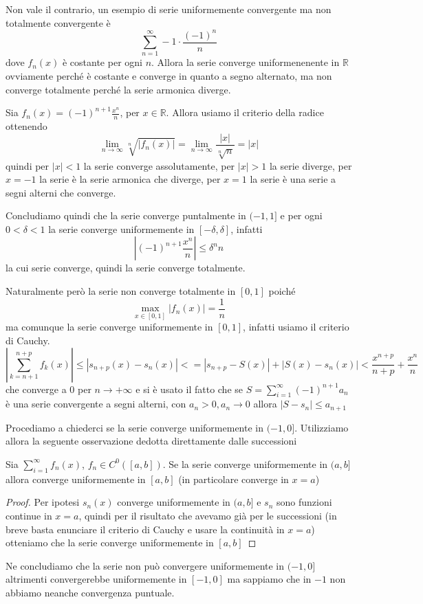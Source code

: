 \begin{example}
Non vale il contrario, un esempio di serie uniformemente convergente ma non
totalmente convergente è
\[
\sum_{n=1}^{\infty} -1 \cdot \frac{{(-1)}^{n}}{n}
\]
dove \(f_{n}(x)\) è costante per ogni \(n\). Allora la serie converge
uniformenenente in \(\mathbb{R}\) ovviamente perché è costante e converge in
quanto a segno alternato, ma non converge totalmente perché la serie armonica
diverge.
\end{example}
\begin{example}
    Sia \(f_{n}(x) = {(-1)}^{n+1} \frac{x^{n}}{n}\), per \(x \in \mathbb{R}\).
    Allora usiamo il criterio della radice ottenendo
    \[
        \lim_{n \to \infty} \sqrt[n]{|f_{n}(x)|} = \lim_{n \to \infty}
        \frac{|x|}{\sqrt[n]{n}} = |x|
    \]
    quindi per \(|x| < 1\) la serie converge assolutamente, per \(|x| > 1\) la
    serie diverge, per \(x = -1\) la serie è la serie armonica che diverge, per
    \(x = 1\) la serie è una serie a segni alterni che converge.

    Concludiamo quindi che la serie converge puntalmente in \((-1, 1]\) e per
    ogni \(0 < \delta < 1\) la serie converge uniformemente in \([-\delta,
    \delta]\), infatti 
    \[
        \left| {(-1)}^{n+1} \frac{x^{n}}{n} \right| \le \delta^{n}{n}
    \]
    la cui serie converge, quindi la serie converge totalmente.

    Naturalmente però la serie non converge totalmente in \([0, 1]\) poiché
\[\max_{x \in [0, 1]} |f_{n}(x)| = \frac{1}{n}\] ma comunque la serie converge
uniformemente in \([0, 1]\), infatti usiamo il criterio di Cauchy.
\[
    \left| \sum_{k=n+1}^{n+p} f_{k}(x) \right| \le |s_{n+p}(x) - s_{n}(x)| <=
    |s_{n+p} - S(x)| + |S(x) - s_{n}(x)| < \frac{x^{n+p}}{n+p} + \frac{x^{n}}{n}
\]
che converge a \(0\) per \(n\to +\infty\)
e si è usato il fatto che se \(S = \sum_{i=1}^{\infty} {(-1)}^{n+1} a_{n} \)
è una serie convergente a segni alterni, con \(a_{n} > 0, a_{n} \to 0\) allora
\(|S - s_{n}| \le a_{n+1} \) 

Procediamo a chiederci se la serie converge uniformemente in \((-1, 0]\).
Utilizziamo allora la seguente osservazione dedotta direttamente dalle
successioni
\begin{remark}
    Sia \(\sum_{i=1}^{\infty} f_{n}(x) \), \(f_{n} \in C^{0}([a, b])\). Se la
    serie converge uniformemente in \((a, b]\) allora converge uniformemente in
    \([a, b]\) (in particolare converge in \(x=a\))
\end{remark}
\begin{proof}
    Per ipotesi \(s_{n}(x)\) converge uniformemente in \((a, b]\) e \(s_{n}\)
    sono funzioni continue in \(x = a\), quindi per il risultato che avevamo già
    per le successioni (in breve basta enunciare il criterio di Cauchy e usare
la continuità in \(x=a\)) otteniamo che la serie converge uniformemente in \([a,
b]\)
\end{proof}
Ne concludiamo che la serie non può convergere uniformemente in \((-1, 0]\)
altrimenti convergerebbe uniformemente in \([-1, 0]\) ma sappiamo che in \(-1\)
non abbiamo neanche convergenza puntuale.
\end{example}

